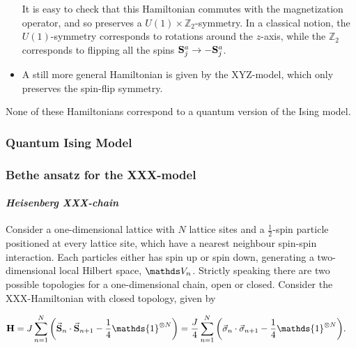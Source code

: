 \documentclass{homework}
\begin{document}
\begin{itemize}
It is easy to check that this Hamiltonian commutes with the magnetization operator, and so preserves a $U(1)\times \mathds{Z}_2$-symmetry. In a classical notion, the $U(1)$-symmetry corresponds to rotations around the $z$-axis, while the $\mathds{Z}_2$ corresponds to flipping all the spins ${{\bf S}_j^a \rightarrow -{\bf S}_j^a}$. \\

\item A still more general Hamiltonian is given by the XYZ-model, which only preserves the spin-flip symmetry. 
\end{itemize}

None of these Hamiltonians correspond to a quantum version of the Ising model. \\

\subsubsection{Quantum Ising Model}




\clearpage

\subsubsection{\textbf{Bethe ansatz for the XXX-model}}

\paragraph{\textit{Heisenberg XXX-chain}}

Consider a one-dimensional lattice with $N$ lattice sites and a $\frac{1}{2}$-spin particle positioned at every lattice site, which have a nearest neighbour spin-spin interaction. Each particles either has spin up or spin down, generating a two-dimensional local Hilbert space, $\vds_n$. Strictly speaking there are two possible topologies for a one-dimensional chain, open or closed. Consider the XXX-Hamiltonian with closed topology, given by 

\begin{equation}
\begin{split}
    {\bf H} &= J \sum_{n=1}^{N} \bigg(\vec{\spin}_n \cdot \vec{\spin}_{n+1} - \frac{1}{4} \mathds{1}^{\otimes N} \bigg) = \frac{J}{4}\sum_{n=1}^{N} \bigg(\vec{\sigma}_n \cdot \vec{\sigma}_{n+1} - \frac{1}{4} \mathds{1}^{\otimes N} \bigg).
    \label{XXX model}
\end{split}
\end{equation}
\end{document}
